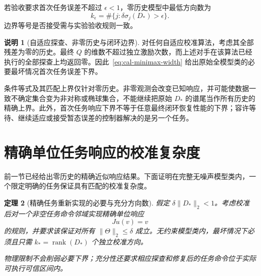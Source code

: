 \documentclass[11pt,a4paper]{article}
\numberwithin{equation}{section}
\newtheorem{theorem}{定理}[section]
\theoremstyle{definition}
\newtheorem{remark}[theorem]{说明}
\begin{document}
若验收要求首次任务误差不超过 $\epsilon<1$，零历史模型中最低方向数为
\begin{equation}
  k_\epsilon=
  \#\{j:\delta\sigma_j(D_*)>\epsilon\}.
  \label{eq:cal-epsilon-dimension}
\end{equation}
边界等号是否接受需与实验验收规则一致。

\begin{remark}[自适应探查、非零历史与闭环边界]
\label{rem:cal-width-scope}
对任何自适应校准算法，考虑其全部残差为零的历史。最终 $Q$ 的维数不超过独立激励次数，而上述对手在该算法已经执行的全部探查上均返回零。因此~\eqref{eq:cal-minimax-width} 给出原始全模型类的必要最坏情况首次任务误差下界。

条件等式及其匹配上界仅针对零历史。非零观测会改变已知响应，并可能使数据一致不确定集合变为非对称或椭球集合，不能继续把原始 $D_*$ 的谱尾当作所有历史的精确上界。此外，首次任务响应下界不等于任意最终闭环恢复性能的下界；容许等待、继续适应或接受暂态误差的控制器解决的是另一个任务。
\end{remark}

\section{精确单位任务响应的校准复杂度}
\label{sec:cal-exact-complexity}

前一节已经给出零历史的精确近似响应结果。下面证明在完整无噪声模型类内，一个限定明确的任务保证具有匹配的校准复杂度。

\begin{theorem}[精确任务重新实现的必要与充分方向数]
\label{thm:cal-exact-task}
假定 $\delta\|D_*\|_2<1$。考虑校准后对一个非空任务命令邻域实现精确单位响应
\begin{equation}
  Ju(v)=v
  \label{eq:cal-unit-task}
\end{equation}
的规则，并要求该保证对所有 $\|\Theta\|_2\le\delta$ 成立。无约束模型类内，最坏情况下必须且只需 $k_*=\operatorname{rank}(D_*)$ 个独立校准方向。

物理限制不会削弱必要下界；充分性还要求相应探查和修复后的任务命令位于实际可执行可信区间内。
\end{theorem}
\end{document}

